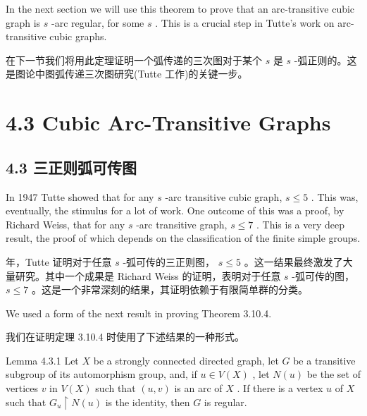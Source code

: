 \documentclass[10pt]{article}
\begin{document}
In the next section we will use this theorem to prove that an arc-transitive cubic graph is \(s\) -arc regular, for some \(s\) . This is a crucial step in Tutte’s work on arc-transitive cubic graphs.

\begin{tcolorbox}\relax
在下一节我们将用此定理证明一个弧传递的三次图对于某个 \(s\) 是 \(s\) -弧正则的。这是图论中图弧传递三次图研究(Tutte 工作)的关键一步。
\end{tcolorbox}

\section*{4.3 Cubic Arc-Transitive Graphs}

\begin{tcolorbox}\relax
\section*{4.3 三正则弧可传图}
\end{tcolorbox}

In 1947 Tutte showed that for any \(s\) -arc transitive cubic graph, \(s \leq  5\) . This was, eventually, the stimulus for a lot of work. One outcome of this was a proof, by Richard Weiss, that for any \(s\) -arc transitive graph, \(s \leq  7\) . This is a very deep result, the proof of which depends on the classification of the finite simple groups.

\begin{tcolorbox} 年，Tutte 证明对于任意 \(s\) -弧可传的三正则图， \(s \leq  5\) 。这一结果最终激发了大量研究。其中一个成果是 Richard Weiss 的证明，表明对于任意 \(s\) -弧可传的图， \(s \leq  7\) 。这是一个非常深刻的结果，其证明依赖于有限简单群的分类。
\end{tcolorbox}

We used a form of the next result in proving Theorem 3.10.4.

\begin{tcolorbox}\relax
我们在证明定理 3.10.4 时使用了下述结果的一种形式。
\end{tcolorbox}

Lemma 4.3.1 Let \(X\) be a strongly connected directed graph, let \(G\) be a transitive subgroup of its automorphism group, and, if \(u \in  V\left( X\right)\) , let \(N\left( u\right)\) be the set of vertices \(v\) in \(V\left( X\right)\) such that \(\left( {u,v}\right)\) is an arc of \(X\) . If there is a vertex \(u\) of \(X\) such that \({G}_{u} \upharpoonright  N\left( u\right)\) is the identity, then \(G\) is regular.
\end{document}

